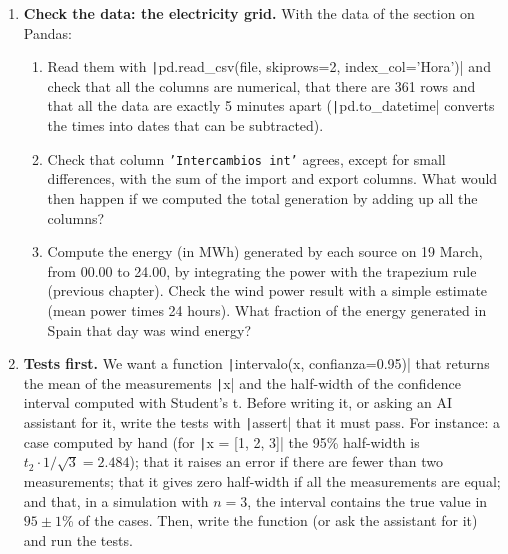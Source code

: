 \begin{enumerate}
\item \label{ej:red_electrica-en} \textbf{Check the data: the electricity grid.} With the data of the section on Pandas:
\begin{enumerate}
\item Read them with \texttt|pd.read_csv(file, skiprows=2, index_col='Hora')| and check that all the columns are numerical, that there are 361 rows and that all the data are exactly 5 minutes apart (\texttt|pd.to_datetime| converts the times into dates that can be subtracted).
\item Check that column \texttt{'Intercambios int'} agrees, except for small differences, with the sum of the import and export columns. What would then happen if we computed the total generation by adding up all the columns?
\item Compute the energy (in MWh) generated by each source on 19 March, from 00.00 to 24.00, by integrating the power with the trapezium rule (previous chapter). Check the wind power result with a simple estimate (mean power times 24 hours). What fraction of the energy generated in Spain that day was wind energy?
\end{enumerate}

\item \label{ej:tests_ia-en} \textbf{Tests first.} We want a function \texttt|intervalo(x, confianza=0.95)| that returns the mean of the measurements \texttt|x| and the half-width of the confidence interval computed with Student's t. Before writing it, or asking an AI assistant for it, write the tests with \texttt|assert| that it must pass. For instance: a case computed by hand (for \texttt|x = [1, 2, 3]| the 95\% half-width is $t_{2}\cdot 1/\sqrt{3}=2.484$); that it raises an error if there are fewer than two measurements; that it gives zero half-width if all the measurements are equal; and that, in a simulation with $n=3$, the interval contains the true value in $95\pm1$\% of the cases. Then, write the function (or ask the assistant for it) and run the tests.
\end{enumerate}

\fussy
